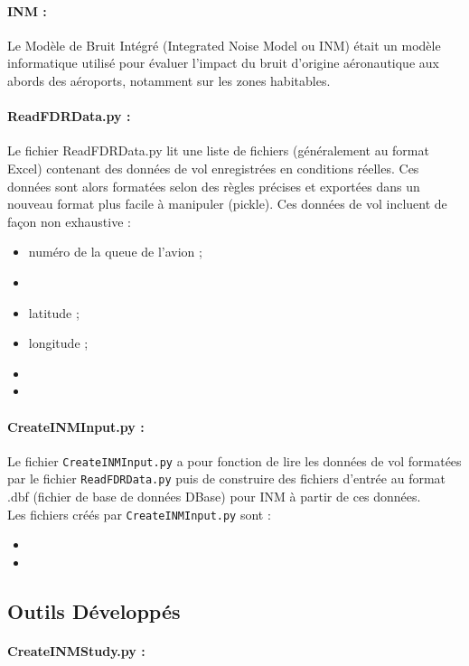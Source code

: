 \documentclass[a4paper]{article}
\newcommand{\code}[1]{\texttt{#1}}
\begin{document}
    \paragraph{INM :}
    Le Modèle de Bruit Intégré (Integrated Noise Model ou INM) était un modèle informatique utilisé pour évaluer l'impact du bruit d'origine aéronautique aux abords des aéroports, notamment sur les zones habitables.
    \paragraph{ReadFDRData.py :}
    Le fichier ReadFDRData.py lit une liste de fichiers (généralement au format Excel) contenant des données de vol enregistrées en conditions réelles. Ces données sont alors formatées selon des règles précises et exportées dans un nouveau format plus facile à manipuler (pickle). Ces données de vol incluent de façon non exhaustive :
    \begin{itemize}
        \item numéro de la queue de l'avion ;
        \item 
        \item latitude ;
        \item longitude ;
        \item 
        \item 
    \end{itemize}
    \paragraph{CreateINMInput.py :}
    Le fichier \code{CreateINMInput.py} a pour fonction de lire les données de vol formatées par le fichier \code{ReadFDRData.py} puis de construire des fichiers d'entrée au format .dbf (fichier de base de données DBase) pour INM à partir de ces données.\\
    Les fichiers créés par \code{CreateINMInput.py} sont :
    \begin{itemize}
        \item 
        \item 
    \end{itemize}
    
    \subsection{Outils Développés}
    \paragraph{CreateINMStudy.py :}
\end{document}
